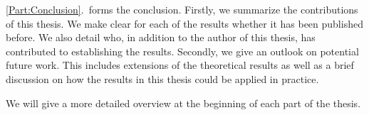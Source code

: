 \documentclass[../../diss.tex]{subfiles}
\begin{document}
\cref{Part:Conclusion}.~forms the conclusion.
Firstly, we summarize the contributions of this thesis.
We make clear for each of the results whether it has been published before.
We also detail who, in addition to the author of this thesis, has contributed to establishing the results.
Secondly, we give an outlook on potential future work.
This includes extensions of the theoretical results as well as a brief discussion on how the results in this thesis could be applied in practice.

We will give a more detailed overview at the beginning of each part of the thesis.
\end{document}
